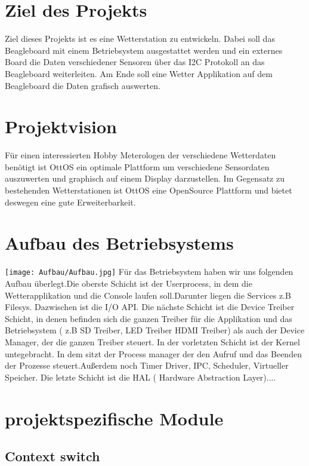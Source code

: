 \documentclass[10pt,a4paper]{article}
\begin{document}
\section{Ziel des Projekts}
 Ziel dieses Projekts ist es eine Wetterstation zu entwickeln. Dabei soll das Beagleboard mit einem Betriebsystem ausgestattet werden und ein externes Board die Daten verschiedener Sensoren über das I2C Protokoll an das Beagleboard weiterleiten. Am Ende soll eine Wetter Applikation auf dem Beagleboard die Daten grafisch auswerten.
\newpage

\section{Projektvision}
Für einen interessierten Hobby Meterologen der verschiedene Wetterdaten benötigt ist OttOS ein optimale Plattform um verschiedene Sensordaten auszuwerten und graphisch auf einem Display darzustellen. Im Gegensatz zu bestehenden Wetterstationen ist OttOS eine OpenSource Plattform und bietet deswegen eine gute Erweiterbarkeit.
\newpage

\section{Aufbau des Betriebsystems}
\texttt{[image: Aufbau/Aufbau.jpg]}\linebreak \linebreak
Für das Betriebsystem haben wir uns folgenden Aufbau überlegt.Die oberste Schicht ist der Userprocess, in dem die Wetterapplikation und die Console laufen soll.Darunter liegen die Services z.B Filesys. Dazwischen ist die I/O API. Die nächste Schicht ist die Device Treiber Schicht, in denen befinden sich die ganzen Treiber für die Applikation und das Betriebsystem ( z.B SD Treiber, LED Treiber HDMI Treiber) als auch der Device Manager, der die ganzen Treiber steuert. In der vorletzten Schicht ist der Kernel untegebracht. In dem sitzt der Process manager der den Aufruf und das Beenden der Prozesse steuert.Außerdem noch Timer Driver, IPC, Scheduler, Virtueller Speicher. Die letzte Schicht ist die HAL ( Hardware Abstraction Layer)....


\section{projektspezifische Module}

\subsection{Context switch}
\newpage
\end{document}
